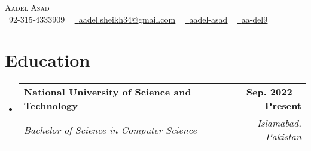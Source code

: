 \documentclass[letterpaper,11pt]{article}
\makeatletter
\newcommand{\resumeSubheading}[4]{
  \vspace{-2pt}\item
    \begin{tabular*}{1.0\textwidth}[t]{l@{\extracolsep{\fill}}r}
      \textbf{#1} & \textbf{\small #2} \\
      \textit{\small#3} & \textit{\small #4} \\
    \end{tabular*}\vspace{-7pt}
}
\newcommand{\resumeSubHeadingListStart}{\begin{itemize}[leftmargin=0.0in, label={}]}
\newcommand{\resumeSubHeadingListEnd}{\end{itemize}}
\makeatother
\begin{document}

\begin{center}
    {\Huge \scshape Aadel Asad} \\ \vspace{1pt}
    \small \raisebox{-0.1\height}\faPhone\ 92-315-4333909 ~ \href{mailto:aadel.sheikh34@gmail.com}{\raisebox{-0.2\height}\faEnvelope\  \underline{aadel.sheikh34@gmail.com}} ~ 
    \href{https://www.linkedin.com/in/aadel-asad/}{\raisebox{-0.2\height}\faLinkedin\ \underline{aadel-asad}}  ~
    \href{https://github.com/aa-del9}{\raisebox{-0.2\height}\faGithub\ \underline{aa-del9}}
    \vspace{-8pt}
\end{center}


\section{Education}
  \resumeSubHeadingListStart
    \resumeSubheading
      {National University of Science and Technology}{Sep. 2022 -- Present}
      {Bachelor of Science in Computer Science}{Islamabad, Pakistan}
  \resumeSubHeadingListEnd

\end{document}
